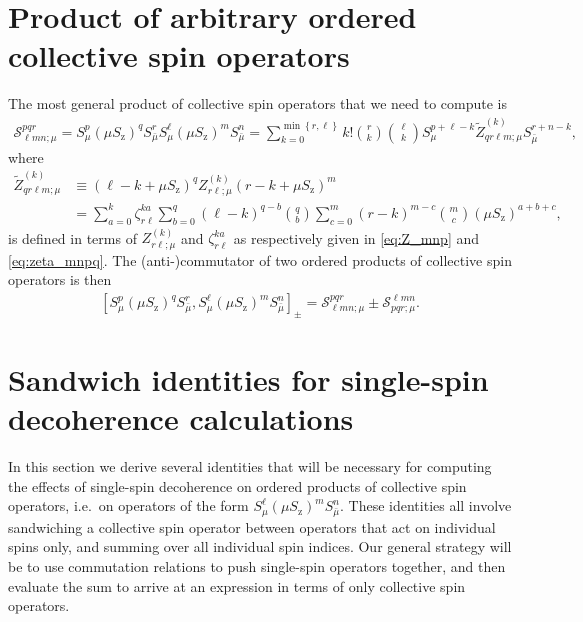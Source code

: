 \documentclass[pra,reprint,longbibliography]{revtex4-1}
\newcommand{\p}[1]{\left(#1\right)} %
\renewcommand{\sp}[1]{\left[#1\right]} %
\renewcommand{\set}[1]{\left\{#1\right\}} %
\renewcommand{\S}{\mathcal{S}}
\newcommand{\z}{\text{z}}
\newcommand{\bmu}{{\bar\mu}}
\newcommand{\1}{\mathds{1}}
\begin{document}
\section{Product of arbitrary ordered collective spin operators}
\label{sec:prod_general}

The most general product of collective spin operators that we need to
compute is
\begin{align}
  \S^{pqr}_{\ell mn;\mu}
  = S_\mu^p \p{\mu S_\z}^q S_\bmu^r
  S_\mu^\ell \p{\mu S_\z}^m S_\bmu^n
  = \sum_{k=0}^{\min\set{r,\ell}} k! { r \choose k } { \ell \choose k }
  S_\mu^{p+\ell-k} \tilde Z_{qr\ell m;\mu}^{(k)} S_\bmu^{r+n-k},
  \label{eq:general_product}
\end{align}
where
\begin{align}
  \tilde Z_{qr\ell m;\mu}^{(k)}
  &\equiv \p{\ell-k+\mu S_\z}^q
  Z_{r\ell;\mu}^{(k)} \p{r-k+\mu S_\z}^m \\
  &= \sum_{a=0}^k \zeta_{r\ell}^{ka}
  \sum_{b=0}^q \p{\ell-k}^{q-b} { q \choose b }
  \sum_{c=0}^m \p{r-k}^{m-c} { m \choose c }
  \p{\mu S_\z}^{a+b+c},
\end{align}
is defined in terms of $Z_{r\ell;\mu}^{(k)}$ and $\zeta_{r\ell}^{ka}$
as respectively given in \eqref{eq:Z_mnp} and \eqref{eq:zeta_mnpq}.
The (anti-)commutator of two ordered products of collective spin
operators is then
\begin{align}
  \sp{S_\mu^p \p{\mu S_\z}^q S_\bmu^r,
    S_\mu^\ell \p{\mu S_\z}^m S_\bmu^n}_\pm
  = \S^{pqr}_{\ell mn;\mu} \pm \S^{\ell mn}_{pqr;\mu}.
\end{align}


\section{Sandwich identities for single-spin decoherence calculations}
\label{sec:sandwich_single}

In this section we derive several identities that will be necessary
for computing the effects of single-spin decoherence on ordered
products of collective spin operators, i.e.~on operators of the form
$S_\mu^\ell \p{\mu S_\z}^m S_\bmu^n$.  These identities all involve
sandwiching a collective spin operator between operators that act on
individual spins only, and summing over all individual spin indices.
Our general strategy will be to use commutation relations to push
single-spin operators together, and then evaluate the sum to arrive at
an expression in terms of only collective spin operators.
\end{document}
